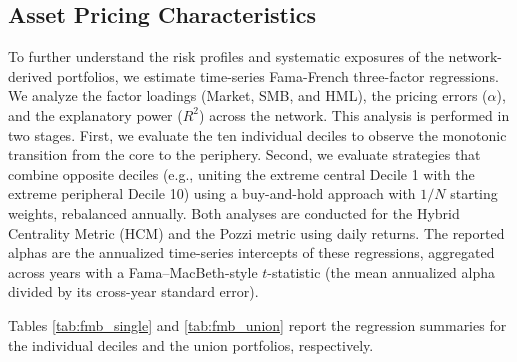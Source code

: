 \documentclass[fleqn]{rbfin}
\begin{document}

\subsection{Asset Pricing Characteristics}

\noindent To further understand the risk profiles and systematic exposures of the network-derived portfolios, we estimate time-series Fama-French three-factor regressions. We analyze the factor loadings (Market, SMB, and HML), the pricing errors ($\alpha$), and the explanatory power ($R^2$) across the network. This analysis is performed in two stages. First, we evaluate the ten individual deciles to observe the monotonic transition from the core to the periphery. Second, we evaluate strategies that combine opposite deciles (e.g., uniting the extreme central Decile 1 with the extreme peripheral Decile 10) using a buy-and-hold approach with $1/N$ starting weights, rebalanced annually. Both analyses are conducted for the Hybrid Centrality Metric (HCM) and the Pozzi metric using daily returns. The reported alphas are the annualized time-series intercepts of these regressions, aggregated across years with a Fama--MacBeth-style $t$-statistic (the mean annualized alpha divided by its cross-year standard error).

Tables \ref{tab:fmb_single} and \ref{tab:fmb_union} report the regression summaries for the individual deciles and the union portfolios, respectively. 
\end{document}
